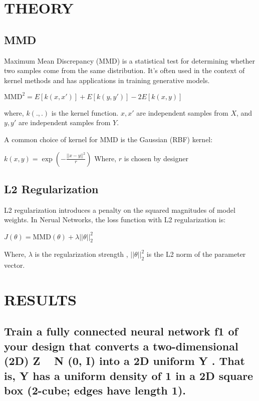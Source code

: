 \documentclass{article}
\begin{document}
\section{THEORY}
\label{sec:theory}

\subsection{MMD}
\label{ssec:mmd}

Maximum Mean Discrepancy (MMD) \cite{gretton2012kernel} is a statistical test for determining whether two samples come from the same distribution. It's often used in the context of kernel methods and has applications in training generative models.

$ \text{MMD}^2 = E[k(x, x')] + E[k(y, y')] - 2E[k(x, y)] $

where, $k(.,.)$ is the kernel function. 
$x, x'$ are independent samples from $X$,
and $y, y'$ are independent samples from $Y$.


A common choice of kernel for MMD is the Gaussian (RBF) kernel:

$ k(x, y) = \exp\left(-\frac{||x - y||^2}{r}\right) $
Where, $r$ is chosen by designer



\subsection{L2 Regularization}
\label{ssec:l2regularization}

L2 regularization \cite{rumelhart1986learning} introduces a penalty on the squared magnitudes of model weights. 
In Nerual Networks, the loss function with L2 regularization is:

$ J(\theta) = \text{MMD}(\theta) + \lambda ||\theta||_2^2 $

Where, $\lambda$ is the regularization strength
, $||\theta||_2^2$ is the L2 norm of the parameter vector.

\section{RESULTS}
\label{sec:results}

\subsection{Train a fully connected neural network f1 of your design that converts a
two-dimensional (2D) Z ~ N (0, I) into a 2D uniform Y . That is, Y has
a uniform density of 1 in a 2D square box (2-cube; edges have length 1).}
\label{ssec:q1}
\end{document}
